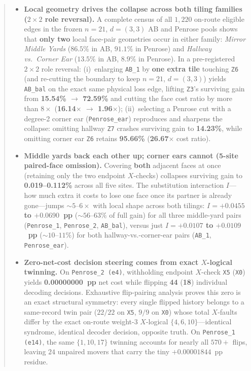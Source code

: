 \documentclass[11pt,a4paper]{article}
\begin{document}
\begin{abstract}
\begin{itemize}
    \item \textbf{Local geometry drives the collapse across both tiling families ($2\times 2$ role reversal).} A complete census of all $1{,}220$ on-route eligible edges in the frozen $n=21$, $d=(3,3)$ AB and Penrose pools shows that \textbf{only two} local face-pair geometries occur in either family: \emph{Mirror Middle Yards} ($86.5\%$ in AB, $91.1\%$ in Penrose) and \emph{Hallway vs.\ Corner Ear} ($13.5\%$ in AB, $8.9\%$ in Penrose). In a pre-registered $2\times 2$ role reversal: (i)~enlarging \texttt{AB\_1} by \textbf{one extra tile} touching \texttt{Z6} (and re-cutting the boundary to keep $n=21$, $d=(3,3)$) yields \texttt{AB\_bal} on the exact same physical loss edge, lifting \texttt{Z3}'s surviving gain from \textbf{15.54\% $\to$ 72.59\%} and cutting the face cost ratio by more than $8\times$ (\textbf{16.14$\times$ $\to$ 1.96$\times$}); (ii)~selecting a Penrose cut with a degree-2 corner ear (\texttt{Penrose\_ear}) reproduces and sharpens the collapse: omitting hallway \texttt{Z7} crashes surviving gain to \textbf{14.23\%}, while omitting corner ear \texttt{Z6} retains \textbf{95.66\%} (\textbf{26.67$\times$} cost ratio).
    \item \textbf{Middle yards back each other up; corner ears cannot (5-site paired-face omission).} Covering \textbf{both} adjacent faces at once (retaining only the two endpoint $X$-checks) collapses surviving gain to \textbf{0.019--0.112\%} across all five sites. The substitution interaction $I$---how much extra it costs to lose one face once its partner is already gone---jumps $\sim 5$--$6\times$ with local shape across both tilings: \textbf{$I = +0.0455$ to $+0.0690$~pp} ($\sim 56$--$63\%$ of full gain) for all three middle-yard pairs (\texttt{Penrose\_1}, \texttt{Penrose\_2}, \texttt{AB\_bal}), versus just \textbf{$I = +0.0107$ to $+0.0109$~pp} ($\sim 10$--$11\%$) for both hallway-vs.-corner-ear pairs (\texttt{AB\_1}, \texttt{Penrose\_ear}).
    \item \textbf{Zero-net-cost decision steering comes from exact $X$-logical twinning.} On \texttt{Penrose\_2 (e4)}, withholding endpoint $X$-check \texttt{X5} (\texttt{X0}) yields \textbf{0.00000000~pp} net cost while flipping \textbf{44} (\textbf{18}) individual decoding decisions. Exhaustive flip-pairing analysis proves this zero is an exact structural symmetry: every single flipped history belongs to a same-record twin pair ($22/22$ on \texttt{X5}, $9/9$ on \texttt{X0}) whose total $X$-faults differ by the exact on-route weight-3 $X$-logical $\{4, 6, 10\}$---identical syndrome, identical decoder decision, opposite truth. On \texttt{Penrose\_1 (e14)}, the same $\{1, 10, 17\}$ twinning accounts for nearly all $570+$ flips, leaving $24$ unpaired movers that carry the tiny $+0.00001844$~pp residue.
\end{itemize}
\end{abstract}
\end{document}
